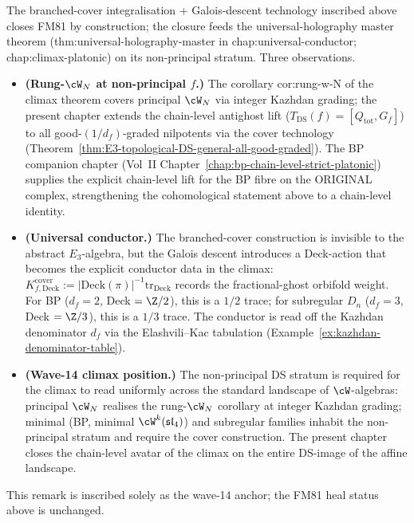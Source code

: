 \begin{remark}%
\label{rem:wave14-anchor-fm81-non-principal-input}%
%
%
%
The branched-cover integralisation + Galois-descent technology
inscribed above closes FM81 by construction; the closure feeds the
universal-holography master theorem
(\textsf{thm:universal-holography-master} in
\textsf{chap:universal-conductor}; \textsf{chap:climax-platonic})
on its non-principal stratum. Three observations.
\begin{itemize}[nosep]
\item \textbf{(Rung-$\cW_N$ at non-principal $f$.)} The corollary
 \textsf{cor:rung-w-N} of the climax theorem covers principal
 $\cW_N$ via integer Kazhdan grading; the present chapter extends
 the chain-level antighost lift
 ($T_{\mathrm{DS}}(f) = [Q_{\mathrm{tot}}, G_f]$) to all
 good-$(1/d_f)$-graded nilpotents via the cover technology
 (Theorem~\ref{thm:E3-topological-DS-general-all-good-graded}). The
 BP companion chapter
 (Vol~II Chapter~\ref{chap:bp-chain-level-strict-platonic})
 supplies the explicit chain-level lift for the BP fibre on the
 ORIGINAL complex, strengthening the cohomological statement
 above to a chain-level identity.
\item \textbf{(Universal conductor.)} The branched-cover construction
 is invisible to the abstract $E_3$-algebra, but the Galois descent
 introduces a Deck-action that becomes the explicit conductor data
 in the climax: $K^{\mathrm{cover}}_{f,\mathrm{Deck}} :=
 |\mathrm{Deck}(\pi)|^{-1} \mathrm{tr}_{\mathrm{Deck}}$ records the
 fractional-ghost orbifold weight. For BP ($d_f = 2$, Deck $=
 \Z/2$), this is a $1/2$ trace; for subregular $D_n$ ($d_f = 3$,
 Deck $= \Z/3$), this is a $1/3$ trace. The conductor is read off
 the Kazhdan denominator $d_f$ via the Elashvili--Kac tabulation
 (Example~\ref{ex:kazhdan-denominator-table}).
\item \textbf{(Wave-14 climax position.)} The non-principal DS
 stratum is required for the climax to read uniformly across the
 standard landscape of $\cW$-algebras: principal $\cW_N$ realises
 the rung-$\cW_N$ corollary at integer Kazhdan grading; minimal
 (BP, minimal $\cW^k(\mathfrak{sl}_4)$) and subregular families
 inhabit the non-principal stratum and require the cover
 construction. The present chapter closes the chain-level avatar
 of the climax on the entire DS-image of the affine landscape.
\end{itemize}
This remark is inscribed solely as the wave-14 anchor; the FM81
heal status above is unchanged.
\end{remark}

